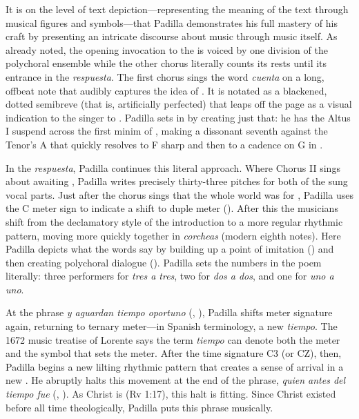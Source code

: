 It is on the level of text depiction---representing the meaning of the text
through musical figures and symbols---that Padilla demonstrates his full mastery
of his craft by presenting an intricate discourse about music through music
itself.
As already noted, the opening invocation to the  is voiced by one division of the polychoral
ensemble while the other chorus literally counts its rests until its entrance in
the \emph{respuesta}.
The first chorus sings the word \emph{cuenta} on a long, offbeat note that
audibly captures the idea of .
It is notated as a blackened, dotted semibreve (that is, artificially perfected)
that leaps off the page as a visual indication to the singer to .
Padilla sets  in  by creating
just that: he has the Altus I suspend across the first minim of ,
making a dissonant seventh against the Tenor's A that quickly resolves to F
sharp and then to a cadence on G in .

In the \emph{respuesta}, Padilla continues this literal approach.
Where Chorus II sings about awaiting , Padilla writes
precisely thirty-three pitches for both of the sung vocal parts.
Just after the chorus sings that the whole world was  for
, Padilla uses the C meter sign to indicate a shift to duple
meter ().  
After this the musicians shift from the declamatory style of the introduction to
a more regular rhythmic pattern, moving more quickly together in \emph{corcheas}
(modern eighth notes).
Here Padilla depicts what the words say by building up a point of imitation
 () and then creating
polychoral dialogue ().
Padilla sets the numbers in the poem literally: three performers for \emph{tres
a tres}, two for \emph{dos a dos}, and one for \emph{uno a uno}.

At the phrase \emph{y aguardan tiempo oportuno} (, ), Padilla shifts meter signature again, returning
to ternary meter---in Spanish terminology, a new \emph{tiempo}.
The 1672 music treatise of Lorente says the term \emph{tiempo} can denote both
the meter and the symbol that sets the meter.%
    \Autocite[bk.~2, 149]{Lorente:Porque}
After the time signature C3 (or CZ), then, Padilla begins a new lilting rhythmic
pattern that creates a sense of arrival in a new .
He abruptly halts this movement at the end of the phrase, \emph{quien antes del
tiempo fue} (, ).
As Christ is  (Rv 1:17), this halt is fitting.
Since Christ existed before all time theologically, Padilla puts this phrase
 musically.

